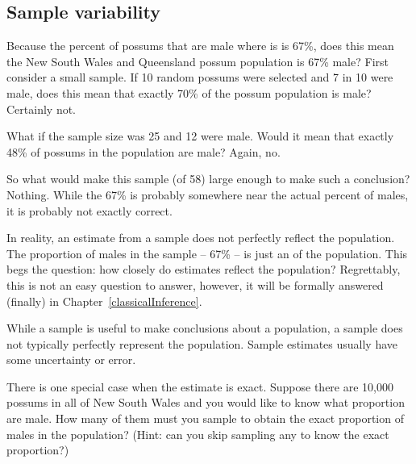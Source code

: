 \subsection{Sample variability}

\begin{example}{Because the percent of possums that are male where  is  is 67\%, does this mean the New South Wales and Queensland possum population is 67\% male?}
First consider a small sample. If 10 random possums were selected and 7 in 10 were male, does this mean that exactly 70\% of the possum population is male? Certainly not.

What if the sample size was 25 and 12 were male. Would it mean that exactly 48\% of possums in the population are male? Again, no.

So what would make this sample (of 58) large enough to make such a conclusion? Nothing. While the 67\% is probably somewhere near the actual percent of males, it is probably not exactly correct.
\end{example}

In reality, an estimate from a sample does not perfectly reflect the population. The proportion of males in the sample -- 67\% -- is just an  of the population. This begs the question: how closely do estimates reflect the population? Regrettably, this is not an easy question to answer, however, it will be formally answered (finally) in Chapter~\ref{classicalInference}. \\

\begin{tipBox}{
While a sample is useful to make conclusions about a population, a sample does not typically perfectly represent the population. Sample estimates usually have some uncertainty or error.}
\end{tipBox}

\begin{exercise}
There is one special case when the estimate is exact. Suppose there are 10,000 possums in all of New South Wales and you would like to know what proportion are male. How many of them must you sample to obtain the exact proportion of males in the population? (Hint: can you skip sampling any to know the exact proportion?)
\end{exercise}

